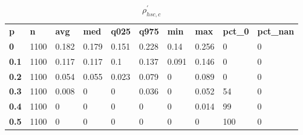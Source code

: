 \begin{table}[h]
 \centering 
\footnotesize
\caption{$\rho_{hsc,c}^\prime $}
\label{tab:alphahscc}
\begin{tabular}[h]{| l l l l l l l l l l|
    } \hline
\textbf{ p} & \textbf{ n} & \textbf{ avg} & \textbf{ med} & \textbf{ q025} & \textbf{ q975} & \textbf{ min} & \textbf{ max} & \textbf{ pct\_0} & \textbf{ pct\_nan}
           \\
  \textbf{  0} & 1100 & 0.182 & 0.179 & 0.151 & 0.228 &  0.14 & 0.256 &   0 & 0
           \\
  \textbf{0.1} & 1100 & 0.117 & 0.117 &   0.1 & 0.137 & 0.091 & 0.146 &   0 & 0
           \\
  \textbf{0.2} & 1100 & 0.054 & 0.055 & 0.023 & 0.079 &     0 & 0.089 &   0 & 0
           \\
  \textbf{0.3} & 1100 & 0.008 &     0 &     0 & 0.036 &     0 & 0.052 &  54 & 0
           \\
  \textbf{0.4} & 1100 &     0 &     0 &     0 &     0 &     0 & 0.014 &  99 & 0
           \\
  \textbf{0.5} & 1100 &     0 &     0 &     0 &     0 &     0 &     0 & 100 & 0
           \\
 \hline \end{tabular}
 \end{table}
